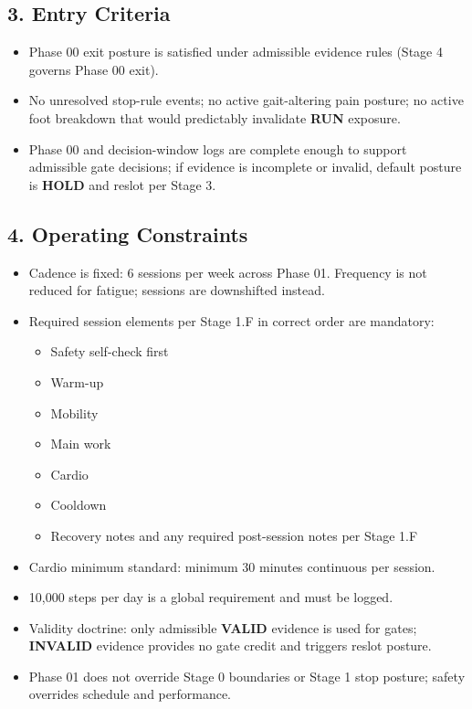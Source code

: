 \documentclass[10pt]{article}
\begin{document}
\subsection*{3. Entry Criteria}

\begin{itemize}
\item Phase 00 exit posture is satisfied under admissible evidence rules (Stage 4 governs Phase 00 exit).
\item No unresolved stop-rule events; no active gait-altering pain posture; no active foot breakdown that would predictably invalidate \textbf{RUN} exposure.
\item Phase 00 and decision-window logs are complete enough to support admissible gate decisions; if evidence is incomplete or invalid, default posture is \textbf{HOLD} and reslot per Stage 3.
\end{itemize}

\subsection*{4. Operating Constraints}

\begin{itemize}
\item Cadence is fixed: 6 sessions per week across Phase 01. Frequency is not reduced for fatigue; sessions are downshifted instead.
\item Required session elements per Stage 1.F in correct order are mandatory:
\begin{itemize}
\item Safety self-check first
\item Warm-up
\item Mobility
\item Main work
\item Cardio
\item Cooldown
\item Recovery notes and any required post-session notes per Stage 1.F
\end{itemize}
\item Cardio minimum standard: minimum 30 minutes continuous per session.
\item 10,000 steps per day is a global requirement and must be logged.
\item Validity doctrine: only admissible \textbf{VALID} evidence is used for gates; \textbf{INVALID} evidence provides no gate credit and triggers reslot posture.
\item Phase 01 does not override Stage 0 boundaries or Stage 1 stop posture; safety overrides schedule and performance.
\end{itemize}
\end{document}
